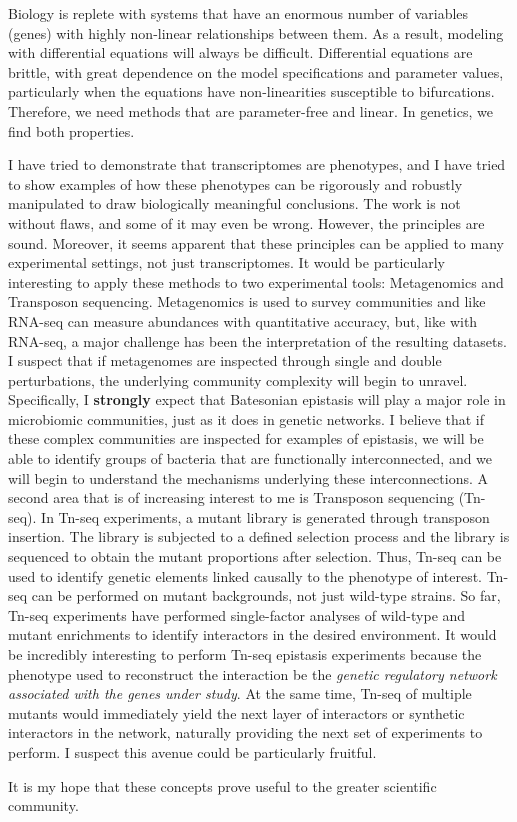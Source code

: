 \documentclass[12pt]{caltech_thesis}
\begin{document}
Biology is replete with systems that have an enormous number of variables
(genes) with highly non-linear relationships between them. As a result, modeling
with differential equations will always be difficult. Differential equations are
brittle, with great dependence on the model specifications and parameter values,
particularly when the equations have non-linearities susceptible to
bifurcations. Therefore, we need methods that are parameter-free and linear.
In genetics, we find both properties.

I have tried to demonstrate that transcriptomes are phenotypes, and I have tried
to show examples of how these phenotypes can be rigorously and robustly
manipulated to draw biologically meaningful conclusions. The work is not without
flaws, and some of it may even be wrong. However, the principles are sound.
Moreover, it seems apparent that these principles can be applied to many
experimental settings, not just transcriptomes. It would be particularly
interesting to apply these methods to two experimental tools: Metagenomics and
Transposon sequencing. Metagenomics is used to survey communities and like
RNA-seq can measure abundances with quantitative accuracy, but, like with
RNA-seq, a major challenge has been the interpretation of the resulting
datasets. I suspect that if metagenomes are inspected through single and double
perturbations, the underlying community complexity will begin to unravel.
Specifically, I \textbf{strongly} expect that Batesonian epistasis will play a
major role in microbiomic communities, just as it does in genetic networks. I
believe that if these complex communities are inspected for examples of
epistasis, we will be able to identify groups of bacteria that are functionally
interconnected, and we will begin to understand the mechanisms underlying these
interconnections. A second area that is of increasing interest to me is
Transposon sequencing (Tn-seq). In Tn-seq experiments, a mutant library is
generated through transposon insertion. The library is subjected to a defined
selection process and the library is sequenced to obtain the mutant proportions
after selection. Thus, Tn-seq can be used to identify genetic elements linked
causally to the phenotype of interest. Tn-seq can be performed on mutant
backgrounds, not just wild-type strains. So far, Tn-seq experiments have
performed single-factor analyses of wild-type and mutant enrichments to identify
interactors in the desired environment. It would be incredibly interesting to
perform Tn-seq epistasis experiments because the phenotype used to reconstruct
the interaction be the \emph{genetic regulatory network associated with the
genes under study}. At the same time, Tn-seq of multiple mutants would
immediately yield the next layer of interactors or synthetic interactors in the
network, naturally providing the next set of experiments to perform. I suspect
this avenue could be particularly fruitful.

It is my hope that these concepts prove useful to the greater scientific
community.



\printindex

\end{document}

